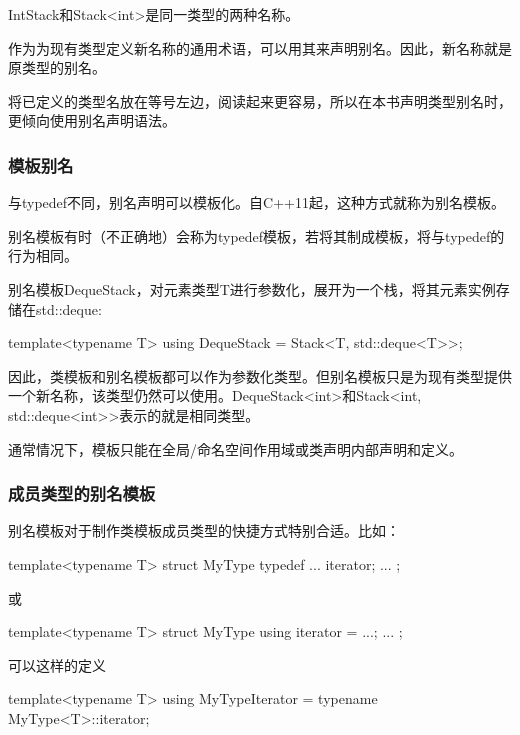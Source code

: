 IntStack和Stack<int>是同一类型的两种名称。

作为为现有类型定义新名称的通用术语，可以用其来声明别名。因此，新名称就是原类型的别名。

将已定义的类型名放在等号左边，阅读起来更容易，所以在本书声明类型别名时，更倾向使用别名声明语法。

\subsubsection{模板别名}

与typedef不同，别名声明可以模板化。自C++11起，这种方式就称为别名模板。

\begin{notice}
别名模板有时（不正确地）会称为typedef模板，若将其制成模板，将与typedef的行为相同。
\end{notice}

别名模板DequeStack，对元素类型T进行参数化，展开为一个栈，将其元素实例存储在std::deque:

\begin{cpp}
template<typename T>
using DequeStack = Stack<T, std::deque<T>>;
\end{cpp}

因此，类模板和别名模板都可以作为参数化类型。但别名模板只是为现有类型提供一个新名称，该类型仍然可以使用。DequeStack<int>和Stack<int, std::deque<int>>表示的就是相同类型。

通常情况下，模板只能在全局/命名空间作用域或类声明内部声明和定义。

\subsubsection{成员类型的别名模板}

别名模板对于制作类模板成员类型的快捷方式特别合适。比如：

\begin{cpp}
template<typename T> struct MyType {
	typedef ... iterator;
	...
};
\end{cpp}

或

\begin{cpp}
template<typename T> struct MyType {
	using iterator = ...;
	...
};
\end{cpp}

可以这样的定义

\begin{cpp}
template<typename T>
using MyTypeIterator = typename MyType<T>::iterator;
\end{cpp}


